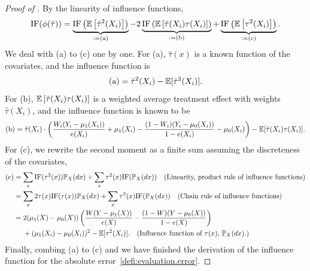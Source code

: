 \begin{proof}[Proof of ]
    
    By the linearity of influence functions, 
    \begin{align*}
        \text{IF}(\phi(\hat{\tau}))
        = \underbrace{\text{IF}\left(\mathbb{E}\left[\hat{\tau}^2(X_i)\right]\right)}_{:=\text{(a)}} 
        - 2\underbrace{\text{IF}\left(\mathbb{E}\left[\hat{\tau}(X_i) {\tau}(X_i)\right]\right)}_{:=\text{(b)}}
        + \underbrace{\text{IF}\left(\mathbb{E}\left[\tau^2(X_i)\right]\right)}_{:=\text{(c)}}.
    \end{align*}
    We deal with (a) to (c) one by one.
    For (a), $\hat{\tau}(x)$ is a known function of the covariates, and the influence function is 
    \begin{align}\label{proof:absolute.error.(a)}
        \text{(a)} = \hat{\tau}^2(X_i) - \mathbb{E}[\hat{\tau}^2(X_i)].
    \end{align}
    For (b), $\mathbb{E}\left[\hat{\tau}(X_i) {\tau}(X_i)\right]$ is a weighted average treatment effect with weights $\hat{\tau}(X_i)$, and the influence function is known to be
    \begin{align}\label{proof:absolute.error.(b)}
        \text{(b)} = \hat{\tau}(X_i) \cdot \left(\frac{W_i(Y_i - \mu_1(X_i))}{e(X_i)} + \mu_1(X_i) - \frac{(1-W_i)(Y_i - \mu_0(X_i))}{1-e(X_i)} - \mu_0(X_i) \right) - \mathbb{E}[\hat{\tau}(X_i) \tau(X_i)].
    \end{align}
    For (c), we rewrite the second moment as a finite sum assuming the discreteness of the covariates,
    \begin{align}\label{proof:absolute.error.(c)}
        \begin{split}
    \text{(c)} 
        &= \sum_x \text{IF}(\tau^2(x)) \mathbb{P}_X(dx) +  \sum_x \tau^2(x) \text{IF}(\mathbb{P}_X(dx)) \quad (\text{Linearity, product rule of influence functions})\\
        &= \sum_x 2 \tau(x) \text{IF}(\tau(x)) \mathbb{P}_X(dx) + \sum_x \tau^2(x) \text{IF}(\mathbb{P}_X(dx)) \quad (\text{Chain rule of influence functions}) \\
        &= 2(\mu_1(X) - \mu_0(X)) \left(\frac{W(Y - \mu_1(X))}{e(X)} - \frac{(1-W)(Y - \mu_0(X))}{1-e(X)}\right) \\
        &\quad~ + (\mu_1(X_i) - \mu_0(X_i))^2- \mathbb{E}[\tau^2(X_i)]. \quad (\text{Influence function of $\tau(x)$, $\mathbb{P}_X(dx)$.})
        \end{split}
    \end{align}
    Finally, combing (a) to (c) and we have finished the derivation of the influence function for the absolute error~\eqref{defi:evaluation.error}.
       

\end{proof}
